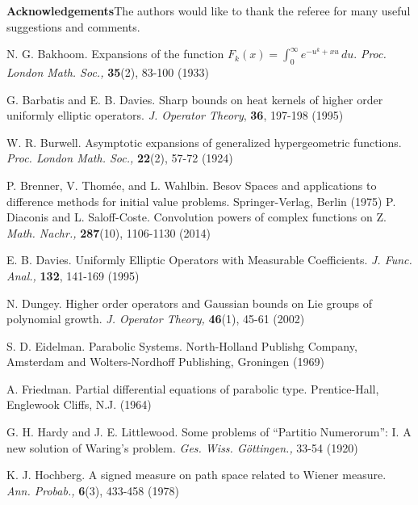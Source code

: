 \documentclass{article}
\theoremstyle{theorem}
\theoremstyle{remark}
\begin{document}
\noindent\small{\textbf{Acknowledgements}\hspace{.25cm}The authors would like to thank the referee for many useful suggestions and comments. }








\begin{thebibliography}{99}

 N. G. Bakhoom. Expansions of the function $F_k(x)=\int_0^{\infty}e^{-u^k+xu}\,du$. \textit{Proc. London Math. Soc.,} \textbf{35}(2), 83-100 (1933)

 G. Barbatis and E. B. Davies. Sharp bounds on heat kernels of higher order uniformly elliptic operators. \textit{J. Operator Theory}, \textbf{36}, 197-198 (1995)

 W. R. Burwell. Asymptotic expansions of generalized hypergeometric functions. \textit{Proc. London Math. Soc.,} \textbf{22}(2), 57-72 (1924)

 P. Brenner, V. Thom\'{e}e, and L. Wahlbin. Besov Spaces and applications to difference methods for initial value problems. Springer-Verlag, Berlin (1975)
 P. Diaconis and L. Saloff-Coste. Convolution powers of complex functions on Z. \textit{Math. Nachr.,} \textbf{287}(10), 1106-1130 (2014)

 E. B. Davies. Uniformly Elliptic Operators with Measurable Coefficients. \textit{J. Func. Anal.,} \textbf{132}, 141-169 (1995)

 N. Dungey. Higher order operators and Gaussian bounds on Lie groups of polynomial growth. \textit{J. Operator Theory,} \textbf{46}(1), 45-61 (2002)

 S. D. Eidelman. Parabolic Systems. North-Holland Publishg Company, Amsterdam and Wolters-Nordhoff Publishing, Groningen (1969) 

 A. Friedman. Partial differential equations of parabolic type. Prentice-Hall, Englewook Cliffs, N.J. (1964)

 G. H. Hardy and J. E. Littlewood. Some problems of ``Partitio Numerorum'': I. A new solution of Waring's problem. \textit{Ges. Wiss. G\"{o}ttingen.,} 33-54 (1920) 

 K. J. Hochberg. A signed measure on path space related to Wiener measure. \textit{Ann. Probab.,} \textbf{6}(3), 433-458 (1978)


\end{thebibliography}
\end{document}
